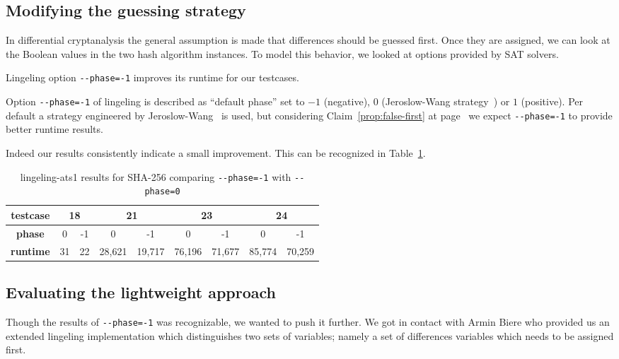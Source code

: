 \subsection{Modifying the guessing strategy}
\label{sec:results-guessing}
%
In differential cryptanalysis the general assumption is made that
differences should be guessed first. Once they are assigned, we
can look at the Boolean values in the two hash algorithm instances.
To model this behavior, we looked at options provided by SAT solvers.

\newcommand\mone[1][-1]{\texttt{-{}-phase=#1}}
\begin{prop}
  Lingeling option \mone{} improves its runtime for our testcases.
\end{prop}
%
Option \mone{} of lingeling is described as \enquote{default phase} set to
$-1$ (negative), $0$ (Jeroslow-Wang strategy~\cite{JeroslowWang})
or $1$ (positive). Per default a strategy engineered by
Jeroslow-Wang~\cite{JeroslowWang} is used, but considering
Claim~\ref{prop:false-first} at page~\pageref{prop:false-first}
we expect \mone{} to provide better runtime results.

Indeed our results consistently indicate a small improvement.
This can be recognized in Table~\ref{tab:phase-results}.

\begin{table}[!h]
  \begin{center}
    \begin{tabular}{c|cc cc cc cc}
      \textbf{testcase} & \multicolumn{2}{c}{18} & \multicolumn{2}{c}{21} & \multicolumn{2}{c}{23} & \multicolumn{2}{c}{24} \\
    \hline
      \textbf{phase}    &       0 &     -1 &       0 &     -1 &       0 &     -1 &       0 &     -1 \\
    \hline
      \textbf{runtime}  &      31 &     22 &  28,621 & 19,717 &  76,196 & 71,677 & 85,774  & 70,259 \\
    \end{tabular}
    \caption{lingeling-ats1 results for SHA-256 comparing \mone{} with \mone[0]{}}
    \label{tab:phase-results}
  \end{center}
\end{table}

\subsection{Evaluating the lightweight approach}
\label{sec:lightweight-results}
%
Though the results of \mone{} was recognizable, we wanted to push it further.
We got in contact with Armin Biere who provided us an extended lingeling implementation
which distinguishes two sets of variables; namely a set of differences variables
which needs to be assigned first.

